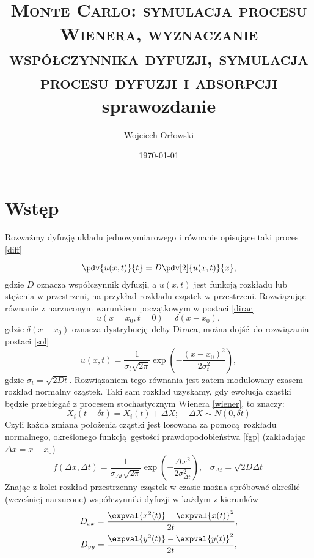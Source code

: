 \documentclass[a4paper, 12pt]{article}
\title{\textsc{Monte Carlo: symulacja procesu Wienera, wyznaczanie \\ współczynnika dyfuzji, symulacja procesu dyfuzji i absorpcji} \\ sprawozdanie}
\author{Wojciech Orłowski}
\date{\today}
\begin{document}
	\maketitle
	
	\section*{Wstęp}
	
	Rozważmy dyfuzję układu jednowymiarowego i równanie opisujące taki proces \eqref{diff}
	
	\begin{equation}
		\pdv{u(x,t)}{t} = D \pdv[2]{u(x,t)}{x},
		\label{diff}
	\end{equation}
	gdzie $D$ oznacza współczynnik dyfuzji, a $u(x,t)$ jest funkcją rozkładu lub stężenia w przestrzeni, na przykład rozkładu cząstek w przestrzeni.
	Rozwiązując równanie z narzuconym warunkiem początkowym w postaci \eqref{dirac}
	\begin{equation}
		u(x = x_0,t=0) = \delta(x - x_0), 
		\label{dirac}
	\end{equation}
	gdzie $\delta(x-x_0)$ oznacza dystrybucję delty Diraca, można dojść do rozwiązania postaci \eqref{sol}
	\begin{equation}
		u(x,t) = \frac{1}{\sigma_t \sqrt{2\pi}} \exp(-\frac{(x-x_0)^2}{2\sigma_t^2}),
		\label{sol}
	\end{equation}
	gdzie $\sigma_t = \sqrt{2Dt}$. Rozwiązaniem tego równania jest zatem modulowany czasem rozkład normalny cząstek. Taki sam rozkład uzyskamy, gdy ewolucja cząstki będzie przebiegać z procesem stochastycznym Wienera \eqref{wiener}, to znaczy:
	\begin{equation}
		X_i(t + \delta t) = X_i(t) + \Delta X; \; \; \; \; \Delta X \sim N(0,\delta t)
		\label{wiener}
	\end{equation}
	Czyli każda zmiana położenia cząstki jest losowana za pomocą rozkładu normalnego, określonego funkcją gęstości prawdopodobieństwa \eqref{fgp} (zakładając $\Delta x = x - x_0$)
	\begin{equation}
		f(\Delta x,\Delta t) = \frac{1}{\sigma_{\Delta t}\sqrt{2\pi}} \exp(- \frac{\Delta x^2}{2\sigma_{\Delta t}^2}), \; \; \; \sigma_{\Delta t} = \sqrt{2D\Delta t}
		\label{fgp}
	\end{equation} 
	Znając z kolei rozkład przestrzenny cząstek w czasie można spróbować określić (wcześniej narzucone) współczynniki dyfuzji w każdym z kierunków
	\begin{gather}
		D_{xx} = \frac{\expval{x^2(t)} - \expval{x(t)}^2}{2t}, \\
		D_{yy} = \frac{\expval{y^2(t)} - \expval{y(t)}^2}{2t},
	\end{gather}
\end{document}

